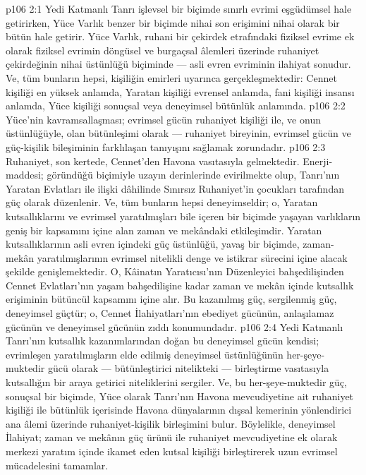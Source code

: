 \vs p106 2:1 Yedi Katmanlı Tanrı işlevsel bir biçimde sınırlı evrimi eşgüdümsel hale getirirken, Yüce Varlık benzer bir biçimde nihai son erişimini nihai olarak bir bütün hale getirir. Yüce Varlık, ruhani bir çekirdek etrafındaki fiziksel evrime ek olarak fiziksel evrimin döngüsel ve burgaçsal âlemleri üzerinde ruhaniyet çekirdeğinin nihai üstünlüğü biçiminde --- asli evren evriminin ilahiyat sonudur. Ve, tüm bunların hepsi, kişiliğin emirleri uyarınca gerçekleşmektedir: Cennet kişiliği en yüksek anlamda, Yaratan kişiliği evrensel anlamda, fani kişiliği insansı anlamda, Yüce kişiliği sonuçsal veya deneyimsel bütünlük anlamında.
\vs p106 2:2 Yüce’nin kavramsallaşması; evrimsel gücün ruhaniyet kişiliği ile, ve onun üstünlüğüyle, olan bütünleşimi olarak --- ruhaniyet bireyinin, evrimsel gücün ve güç\hyp{}kişilik bileşiminin farklılaşan tanıyışını sağlamak zorundadır.
\vs p106 2:3 Ruhaniyet, son kertede, Cennet’den Havona vasıtasıyla gelmektedir. Enerji\hyp{}maddesi; göründüğü biçimiyle uzayın derinlerinde evirilmekte olup, Tanrı’nın Yaratan Evlatları ile ilişki dâhilinde Sınırsız Ruhaniyet’in çocukları tarafından güç olarak düzenlenir. Ve, tüm bunların hepsi deneyimseldir; o, Yaratan kutsallıklarını ve evrimsel yaratılmışları bile içeren bir biçimde yaşayan varlıkların geniş bir kapsamını içine alan zaman ve mekândaki etkileşimdir. Yaratan kutsallıklarının asli evren içindeki güç üstünlüğü, yavaş bir biçimde, zaman\hyp{}mekân yaratılmışlarının evrimsel nitelikli denge ve istikrar sürecini içine alacak şekilde genişlemektedir. O, Kâinatın Yaratıcısı’nın Düzenleyici bahşedilişinden Cennet Evlatları’nın yaşam bahşedilişine kadar zaman ve mekân içinde kutsallık erişiminin bütüncül kapsamını içine alır. Bu kazanılmış güç, sergilenmiş güç, deneyimsel güçtür; o, Cennet İlahiyatları’nın ebediyet gücünün, anlaşılamaz gücünün ve deneyimsel gücünün zıddı konumundadır.
\vs p106 2:4 Yedi Katmanlı Tanrı’nın kutsallık kazanımlarından doğan bu deneyimsel gücün kendisi; evrimleşen yaratılmışların elde edilmiş deneyimsel üstünlüğünün her\hyp{}şeye\hyp{}muktedir gücü olarak --- bütünleştirici nitelikteki --- birleştirme vasıtasıyla kutsallığın bir araya getirici niteliklerini sergiler. Ve, bu her\hyp{}şeye\hyp{}muktedir güç, sonuçsal bir biçimde, Yüce olarak Tanrı’nın Havona mevcudiyetine ait ruhaniyet kişiliği ile bütünlük içerisinde Havona dünyalarının dışsal kemerinin yönlendirici ana âlemi üzerinde ruhaniyet\hyp{}kişilik birleşimini bulur. Böylelikle, deneyimsel İlahiyat; zaman ve mekânın güç ürünü ile ruhaniyet mevcudiyetine ek olarak merkezi yaratım içinde ikamet eden kutsal kişiliği birleştirerek uzun evrimsel mücadelesini tamamlar.

